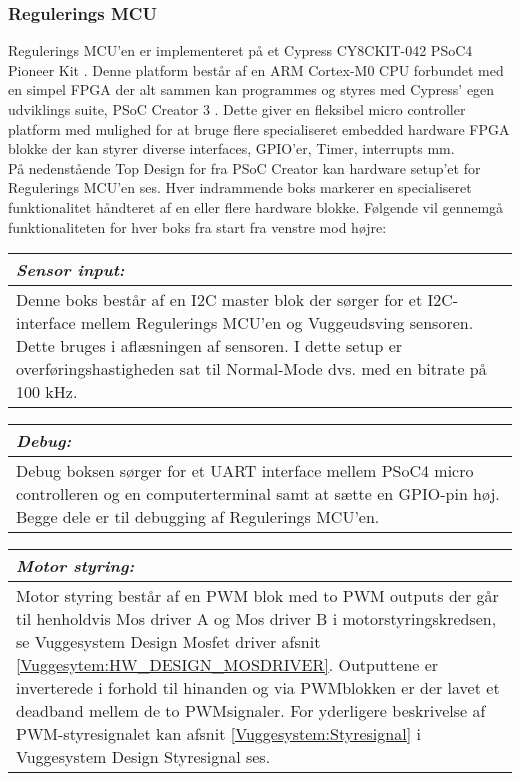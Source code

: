 \subsubsection{Regulerings MCU} \label{Vuggesystem: R_MCU} 
Regulerings MCU'en er implementeret på et Cypress CY8CKIT-042 PSoC4 Pioneer Kit \citep{website:Cypress}. Denne platform består af en ARM Cortex-M0 CPU forbundet med en simpel FPGA der alt sammen kan programmes og styres med Cypress' egen udviklings suite, PSoC Creator 3 \citep{website:PSoC_Creator}. Dette giver en fleksibel micro controller platform med mulighed for at bruge flere specialiseret embedded hardware FPGA blokke der kan styrer diverse interfaces, GPIO'er, Timer, interrupts mm. \\
På nedenstående Top Design for fra PSoC Creator kan hardware setup'et for Regulerings MCU'en ses. Hver indrammende boks markerer en specialiseret funktionalitet håndteret af en eller flere hardware blokke.
Følgende vil gennemgå funktionaliteten for hver boks fra start fra venstre mod højre:
\begin{center}
    \begin{tabular}{| p{14.5cm} |}
    \hline
    \textit{Sensor input:} \\ \hline
    Denne boks består af en I2C master blok der sørger for et I2C-interface mellem Regulerings MCU'en og Vuggeudsving sensoren. Dette bruges i aflæsningen af sensoren. I dette setup er overføringshastigheden sat til Normal-Mode dvs. med en bitrate på 100 kHz. \\ \hline
    \end{tabular}
\end{center}

\begin{center}
    \begin{tabular}{| p{14.5cm} |}
    \hline
    \textit{Debug:} \\ \hline
    Debug boksen sørger for et UART interface mellem PSoC4 micro controlleren og en computerterminal samt at sætte en GPIO-pin høj. Begge dele er til debugging af Regulerings MCU'en. \\ \hline
    \end{tabular}
\end{center}

\begin{center}
    \begin{tabular}{| p{14.5cm} |}
    \hline
    \textit{Motor styring:} \\ \hline
    Motor styring består af en PWM blok med to PWM outputs der går til henholdvis Mos driver A og Mos driver B i motorstyringskredsen, se Vuggesystem Design Mosfet driver afsnit \vref{Vuggesytem:HW_DESIGN_MOSDRIVER}. Outputtene er inverterede i forhold til hinanden og via PWMblokken er der lavet et deadband mellem de to PWMsignaler. For yderligere beskrivelse af PWM-styresignalet kan afsnit \vref{Vuggesystem:Styresignal} i Vuggesystem Design Styresignal ses. \\ \hline
    \end{tabular}
\end{center}


